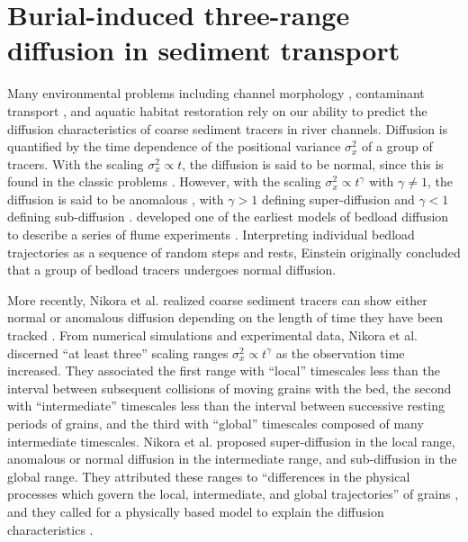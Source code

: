 
\chapter{Burial-induced three-range diffusion in sediment transport}
\label{ch:downDiff}

Many environmental problems including channel morphology \citep{Hassan2017}, contaminant transport \citep{Macklin2006}, and aquatic habitat restoration \citep{Gaeuman2017} rely on our ability to predict the diffusion characteristics of coarse sediment tracers in river channels.
Diffusion is quantified by the time dependence of the positional variance $\sigma_x^2$ of a group of tracers.
With the scaling $\sigma_x^2 \propto t$, the diffusion is said to be normal, since this is found in the classic problems \citep{Einstein1905}.
However, with the scaling $\sigma_x^2 \propto t^\gamma$ with $\gamma \neq 1$, the diffusion is said to be anomalous \citep{Sokolov2012}, with $\gamma>1$ defining super-diffusion and $\gamma<1$ defining sub-diffusion \citep{Metzler2000}.
\citet{Einstein1937} developed one of the earliest models of bedload diffusion to describe a series of flume experiments \citep{Ettema2004}.
Interpreting individual bedload trajectories as a sequence of random steps and rests, Einstein originally concluded that a group of bedload tracers undergoes normal diffusion.

More recently, Nikora et al. realized coarse sediment tracers can show either normal or anomalous diffusion depending on the length of time they have been tracked \citep{Nikora2001a,Nikora2002}.
From numerical simulations and experimental data, Nikora et al. discerned ``at least three'' scaling ranges $\sigma_x^2 \propto t^\gamma$ as the observation time increased.
They associated the first range with ``local'' timescales less than the interval between subsequent collisions of moving grains with the bed, the second with ``intermediate'' timescales less than the interval between successive resting periods of grains, and the third with ``global'' timescales composed of many intermediate timescales.
Nikora et al. proposed super-diffusion in the local range, anomalous or normal diffusion in the intermediate range, and sub-diffusion in the global range.
They attributed these ranges to ``differences in the physical processes which govern the local, intermediate, and global trajectories'' of grains \citep{Nikora2001a}, and they called for a physically based model to explain the diffusion characteristics \citep{Nikora2002}.

